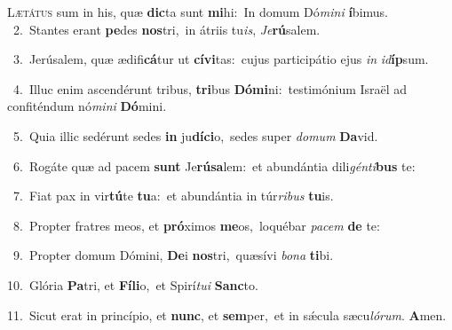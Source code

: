 \lettrine{\initial\textcolor{\initialcolor}{L}}{ætátus} sum in his, quæ \textbf{dic}\-ta sunt \textbf{mi}\-hi:~\star In domum Dó\-\textit{mi}\-\textit{ni} \textbf{í}\-bimus.\\
{\numbfont\textcolor{\numbcolor}{~2.}}~Stantes erant \textbf{pe}\-des \textbf{nos}\-tri,~\star in átriis tu\-\textit{is}\-, \textit{Je}\-\textbf{rú}salem.\par
{\numbfont\textcolor{\numbcolor}{~3.}}~Jerúsalem, quæ ædifi\-\textbf{cá}\-tur ut \textbf{cí}\-\textbf{vi}tas:~\star cujus participátio ejus \textit{in} \textit{id}\-\textbf{íp}sum.\par
{\numbfont\textcolor{\numbcolor}{~4.}}~Illuc enim ascendérunt tribus, \textbf{tri}\-bus \textbf{Dó}\-\textbf{mi}ni:~\star testimónium Israël ad confiténdum nó\-\textit{mi}\-\textit{ni} \textbf{Dó}\-mini.\par
{\numbfont\textcolor{\numbcolor}{~5.}}~Quia illic sedérunt sedes \textbf{in} ju\-\textbf{dí}\-\textbf{ci}o,~\star sedes super \textit{do}\-\textit{mum} \textbf{Da}\-vid.\par
{\numbfont\textcolor{\numbcolor}{~6.}}~Rogáte quæ ad pacem \textbf{sunt} Je\-\textbf{rú}\-\textbf{sa}lem:~\star et abundántia dili\-\textit{gén}\-\textit{ti}\textbf{bus} te:\par
{\numbfont\textcolor{\numbcolor}{~7.}}~Fiat pax in vir\-\textbf{tú}\-te \textbf{tu}\-a:~\star et abundántia in túr\-\textit{ri}\-\textit{bus} \textbf{tu}\-is.\par
{\numbfont\textcolor{\numbcolor}{~8.}}~Propter fratres meos, et \textbf{pró}\-ximos \textbf{me}\-os,~\star loquébar \textit{pa}\-\textit{cem} \textbf{de} te:\par
{\numbfont\textcolor{\numbcolor}{~9.}}~Propter domum Dómini, \textbf{De}\-i \textbf{nos}\-tri,~\star quæsívi \textit{bo}\-\textit{na} \textbf{ti}\-bi.\par
{\numbfont\textcolor{\numbcolor}{10.}}~Glória \textbf{Pa}\-tri, et \textbf{Fí}\-\textbf{li}o,~\star et Spirí\-\textit{tu}\-\textit{i} \textbf{Sanc}\-to.\par
{\numbfont\textcolor{\numbcolor}{11.}}~Sicut erat in princípio, et \textbf{nunc}\-, et \textbf{sem}\-per,~\star et in sǽcula sæcu\-\textit{ló}\-\textit{rum}. \textbf{A}\-men.\par
